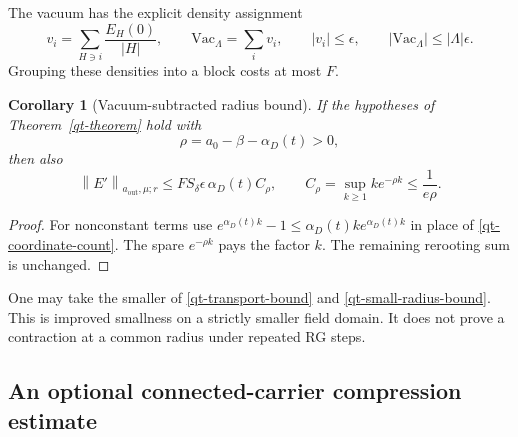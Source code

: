 \documentclass[11pt]{article}
\newtheorem{corollary}[theorem]{Corollary}
\theoremstyle{remark}
\newcommand{\norm}[1]{\left\|#1\right\|}
\begin{document}
The vacuum has the explicit density assignment
\begin{equation}\label{qt-vacuum-density}
 v_i=\sum_{H\ni i}\frac{E_H(0)}{|H|},\qquad
 \mathrm{Vac}_\Lambda=\sum_i v_i,
 \qquad |v_i|\le\epsilon,
 \qquad |\mathrm{Vac}_\Lambda|\le|\Lambda|\epsilon.
\end{equation}
Grouping these densities into a block costs at most $F$.

\begin{corollary}[Vacuum-subtracted radius bound]\label{qt-small-radius}
If the hypotheses of Theorem~\ref{qt-theorem} hold with
\begin{equation}\label{qt-spare-reserve}
 \rho=a_0-\beta-\alpha_D(t)>0,
\end{equation}
then also
\begin{equation}\label{qt-small-radius-bound}
 \norm{E'}_{a_{\mathrm{out}},\mu;r}
 \le F S_\delta\epsilon\,\alpha_D(t) C_\rho,
 \qquad C_\rho=\sup_{k\ge1}k e^{-\rho k}\le\frac1{e\rho}.
\end{equation}
\end{corollary}
\begin{proof}
For nonconstant terms use
$e^{\alpha_D(t)k}-1\le\alpha_D(t)k e^{\alpha_D(t)k}$
in place of \eqref{qt-coordinate-count}. The spare
$e^{-\rho k}$ pays the factor $k$. The remaining rerooting sum
is unchanged.
\end{proof}
One may take the smaller of \eqref{qt-transport-bound} and
\eqref{qt-small-radius-bound}. This is improved smallness on a
strictly smaller field domain. It does not prove a contraction
at a common radius under repeated RG steps.

\subsection{An optional connected-carrier compression estimate}
\label{qt-compression-section}
\end{document}
